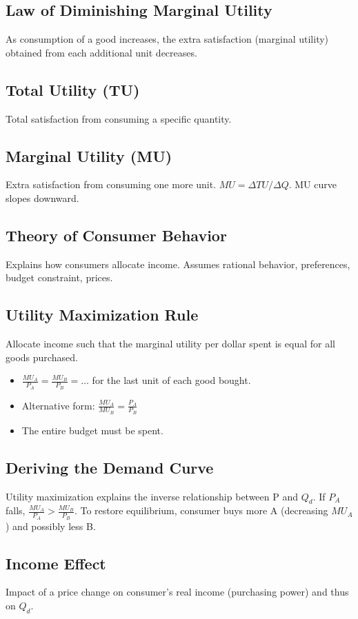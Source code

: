 \documentclass{article}
\begin{document}
\subsection*{Law of Diminishing Marginal Utility}
As consumption of a good increases, the extra satisfaction (marginal utility) obtained from each additional unit decreases.

\subsection*{Total Utility (TU)}
Total satisfaction from consuming a specific quantity.

\subsection*{Marginal Utility (MU)}
Extra satisfaction from consuming one more unit. $MU = \Delta TU / \Delta Q$. MU curve slopes downward.

\subsection*{Theory of Consumer Behavior}
Explains how consumers allocate income. Assumes rational behavior, preferences, budget constraint, prices.

\subsection*{Utility Maximization Rule}
Allocate income such that the marginal utility per dollar spent is equal for all goods purchased.
\begin{itemize}
    \item $\frac{MU_A}{P_A} = \frac{MU_B}{P_B} = \dots$ for the last unit of each good bought.
    \item Alternative form: $\frac{MU_A}{MU_B} = \frac{P_A}{P_B}$
    \item The entire budget must be spent.
\end{itemize}

\subsection*{Deriving the Demand Curve}
Utility maximization explains the inverse relationship between P and $Q_d$. If $P_A$ falls, $\frac{MU_A}{P_A} > \frac{MU_B}{P_B}$. To restore equilibrium, consumer buys more A (decreasing $MU_A$) and possibly less B.

\subsection*{Income Effect}
Impact of a price change on consumer's real income (purchasing power) and thus on $Q_d$.
\end{document}
